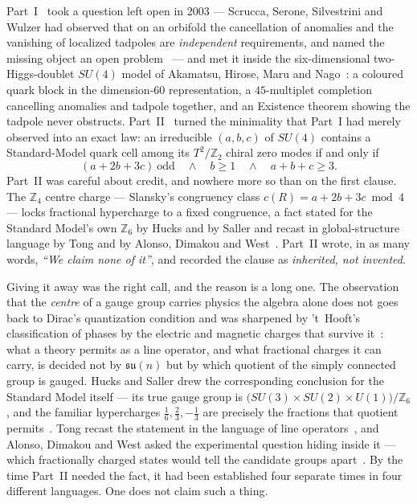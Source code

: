 \documentclass[11pt,a4paper]{article}
\newcommand{\ZZ}{\mathbb{Z}}
\begin{document}
Part~I~\cite{PartI} took a question left open in 2003 --- Scrucca, Serone, Silvestrini and
Wulzer had observed that on an orbifold the cancellation of anomalies and the vanishing of
localized tadpoles are \emph{independent} requirements, and named the missing object an open
problem~\cite{SSSW} --- and met it inside the six-dimensional two-Higgs-doublet $SU(4)$
model of Akamatsu, Hirose, Maru and Nago~\cite{AHMN}: a coloured quark block in the
dimension-$60$ representation, a $45$-multiplet completion cancelling anomalies and tadpole
together, and an Existence theorem showing the tadpole never obstructs. Part~II~\cite{PartII}
turned the minimality that Part~I had merely observed into an exact law: an irreducible
$(a,b,c)$ of $SU(4)$ contains a Standard-Model quark cell among its $T^2/\ZZ_2$ chiral zero
modes if and only if
\begin{equation}\label{eq:criterion}
(a+2b+3c)\ \text{odd}\quad\wedge\quad b\ge1\quad\wedge\quad a+b+c\ge3 .
\end{equation}
Part~II was careful about credit, and nowhere more so than on the first clause. The $\ZZ_4$
centre charge --- Slansky's congruency class $c(R)=a+2b+3c \bmod 4$~\cite{Slansky} --- locks
fractional hypercharge to a fixed congruence, a fact stated for the Standard Model's own
$\ZZ_6$ by Hucks and by Saller and recast in global-structure language by Tong and by
Alonso, Dimakou and West~\cite{Hucks,Saller,Tong,Alonso}. Part~II wrote, in as many words,
\emph{``We claim none of it''}, and recorded the clause as \emph{inherited, not invented}.

Giving it away was the right call, and the reason is a long one. The observation that the
\emph{centre} of a gauge group carries physics the algebra alone does not goes back to
Dirac's quantization condition and was sharpened by 't~Hooft's classification of phases by
the electric and magnetic charges that survive it~\cite{tHooft}: what a theory permits as a
line operator, and what fractional charges it can carry, is decided not by
$\mathfrak{su}(n)$ but by which quotient of the simply connected group is gauged. Hucks and
Saller drew the corresponding conclusion for the Standard Model itself --- its true gauge
group is $\big(SU(3)\times SU(2)\times U(1)\big)/\ZZ_6$, and the familiar hypercharges
$\tfrac16,\tfrac23,-\tfrac13$ are precisely the fractions that quotient
permits~\cite{Hucks,Saller}. Tong recast the statement in the language of line
operators~\cite{Tong}, and Alonso, Dimakou and West asked the experimental question hiding
inside it --- which fractionally charged states would tell the candidate groups
apart~\cite{Alonso}. By the time Part~II needed the fact, it had been established four
separate times in four different languages. One does not claim such a thing.
\end{document}
